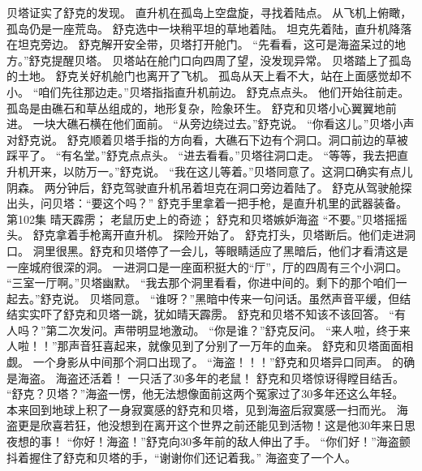 \documentclass[a4paper,12pt,UTF8,twoside]{ctexbook}
\begin{document}
        贝塔证实了舒克的发现。 
        直升机在孤岛上空盘旋，寻找着陆点。 
        从飞机上俯瞰，孤岛仍是一座荒岛。 
        舒克选中一块稍平坦的草地着陆。 
        坦克先着陆，直升机降落在坦克旁边。 
        舒克解开安全带，贝塔打开舱门。 
        “先看看，这可是海盗呆过的地方。”舒克提醒贝塔。 
        贝塔站在舱门口向四周了望，没发现异常。 
        贝塔踏上了孤岛的土地。 
        舒克关好机舱门也离开了飞机。 
        孤岛从天上看不大，站在上面感觉却不小。 
        “咱们先往那边走。”贝塔指指直升机前边。 
        舒克点点头。 
        他们开始往前走。 
        孤岛是由礁石和草丛组成的，地形复杂，险象环生。 
        舒克和贝塔小心翼翼地前进。 
        一块大礁石横在他们面前。 
        “从旁边绕过去。”舒克说。 
        “你看这儿。”贝塔小声对舒克说。 
        舒克顺着贝塔手指的方向看，大礁石下边有个洞口。洞口前边的草被踩平了。 
        “有名堂。”舒克点点头。 
        “进去看看。”贝塔往洞口走。 
        “等等，我去把直升机开来，以防万一。”舒克说。 
        “我在这儿等着。”贝塔同意了。这洞口确实有点儿阴森。 
        两分钟后，舒克驾驶直升机吊着坦克在洞口旁边着陆了。 
        舒克从驾驶舱探出头，问贝塔：“要这个吗？” 
        舒克手里拿着一把手枪，是直升机里的武器装备。   第102集 
        晴天霹雳； 
        老鼠历史上的奇迹； 
        舒克和贝塔嫉妒海盗   
        “不要。”贝塔摇摇头。 
        舒克拿着手枪离开直升机。 
        探险开始了。 
        舒克打头，贝塔断后。他们走进洞口。 
        洞里很黑。舒克和贝塔停了一会儿，等眼睛适应了黑暗后，他们才看清这是一座城府很深的洞。 
        一进洞口是一座面积挺大的“厅”，厅的四周有三个小洞口。 
        “三室一厅啊。”贝塔幽默。 
        “我去那个洞里看看，你进中间的。剩下的那个咱们一起去。”舒克说。 
        贝塔同意。 
        “谁呀？”黑暗中传来一句问话。虽然声音平缓，但结结实实吓了舒克和贝塔一跳，犹如晴天霹雳。 
        舒克和贝塔不知该不该回答。 
        “有人吗？”第二次发问。声带明显地激动。 
        “你是谁？”舒克反问。 
        “来人啦，终于来人啦！！”那声音狂喜起来，就像见到了分别了一万年的血亲。 
        舒克和贝塔面面相觑。 
        一个身影从中间那个洞口出现了。 
        “海盗！！！”舒克和贝塔异口同声。 
        的确是海盗。 
        海盗还活着！ 
        一只活了30多年的老鼠！ 
        舒克和贝塔惊讶得瞠目结舌。 
        “舒克？贝塔？”海盗一愣，他无法想像面前这两个冤家过了30多年还这么年轻。 
        本来回到地球上积了一身寂寞感的舒克和贝塔，见到海盗后寂寞感一扫而光。 
        海盗更是欣喜若狂，他没想到在离开这个世界之前还能见到活物！这是他30年来日思夜想的事！ 
        “你好！海盗！”舒克向30多年前的敌人伸出了手。 
        “你们好！”海盗颤抖着握住了舒克和贝塔的手，“谢谢你们还记着我。” 
        海盗变了一个人。 
\end{document}
